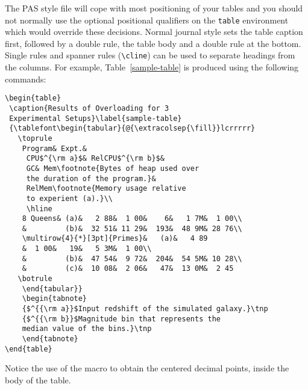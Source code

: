 \documentclass{pas}
\begin{document}
The PAS style file will cope with most positioning of your tables
and you should not normally use the optional positional qualifiers on the
\verb"table" environment which would override these decisions.
Normal journal style sets the table caption first, followed by a double
rule, the table body and a double rule at the bottom.  Single rules and
spanner rules (\verb"\cline") can be used to separate headings from the
columns.  For example, Table~\ref{sample-table} is produced using the
following commands:\par
%
{\fontsize{7}{9}\selectfont
\begin{verbatim}
\begin{table}
 \caption{Results of Overloading for 3
 Experimental Setups}\label{sample-table}
 {\tablefont\begin{tabular}{@{\extracolsep{\fill}}lcrrrrr}
   \toprule
    Program& Expt.&
     CPU$^{\rm a}$& RelCPU$^{\rm b}$&
     GC& Mem\footnote{Bytes of heap used over
     the duration of the program.}&
     RelMem\footnote{Memory usage relative
     to experient (a).}\\
     \hline
    8 Queens& (a)&   2 88&  1 00&    6&   1 7M&  1 00\\
    &         (b)&  32 51& 11 29&  193&  48 9M& 28 76\\
    \multirow{4}{*}[3pt]{Primes}&   (a)&   4 89
    &  1 00&   19&   5 3M&  1 00\\
    &         (b)&  47 54&  9 72&  204&  54 5M& 10 28\\
    &         (c)&  10 08&  2 06&   47&  13 0M&  2 45
   \botrule
    \end{tabular}}
    \begin{tabnote}
    {$^{{\rm a}}$Input redshift of the simulated galaxy.}\tnp
    {$^{{\rm b}}$Magnitude bin that represents the
    median value of the bins.}\tnp
    \end{tabnote}
\end{table}
\end{verbatim}}
%
\noindent Notice the use of the \verb"" macro to obtain the centered
decimal points, inside the body of the table.
\end{document}
